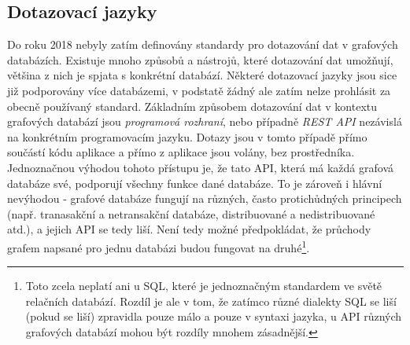 







\subsection{Dotazovací jazyky}

Do roku 2018 nebyly zatím definovány standardy pro dotazování dat v grafových databázích. Existuje mnoho způsobů a nástrojů, které dotazování dat umožňují, většina z nich je spjata s konkrétní databází. Některé dotazovací jazyky jsou sice již podporovány více databázemi, v podstatě žádný ale zatím nelze prohlásit za obecně používaný standard. Základním způsobem dotazování dat v kontextu grafových databází jsou \textit{programová rozhraní}, nebo případně \textit{REST API} nezávislá na konkrétním programovacím jazyku. Dotazy jsou v tomto případě přímo součástí kódu aplikace a přímo z aplikace jsou volány, bez prostředníka. Jednoznačnou výhodou tohoto přístupu je, že tato API, která má každá grafová databáze své, podporují všechny funkce dané databáze. To je zároveň i hlávní nevýhodou - grafové databáze fungují na různých, často protichůdných principech (např. tranasakční a netransakční databáze, distribuované a nedistribuované atd.), a jejich API se tedy liší. Není tedy možné předpokládat, že průchody grafem napsané pro jednu databázi budou fungovat na druhé\footnote{Toto zcela neplatí ani u SQL, které je jednoznačným standardem ve světě relačních databází. Rozdíl je ale v tom, že zatímco různé dialekty SQL se liší (pokud se liší) zpravidla pouze málo a pouze v syntaxi jazyka, u API různých grafových databází mohou být rozdíly mnohem zásadnější.}.   

